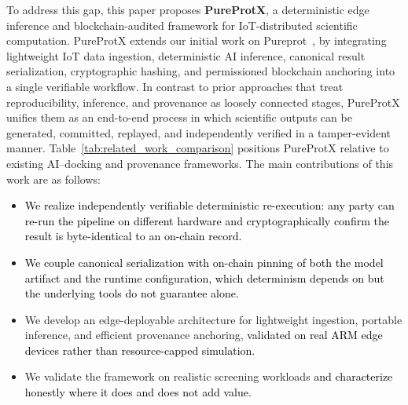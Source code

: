 \documentclass[conference]{IEEEtran}
\begin{document}
To address this gap, this paper proposes \textbf{PureProtX}, a deterministic edge inference and blockchain-audited framework for IoT-distributed scientific computation. PureProtX extends our initial work on Pureprot~\cite{kanu2025pureprot}, by integrating lightweight IoT data ingestion, deterministic AI inference, canonical result serialization, cryptographic hashing, and permissioned blockchain anchoring into a single verifiable workflow. In contrast to prior approaches that treat reproducibility, inference, and provenance as loosely connected stages, PureProtX unifies them as an end-to-end process in which scientific outputs can be generated, committed, replayed, and independently verified in a tamper-evident manner. Table~\ref{tab:related_work_comparison} positions PureProtX relative to existing AI--docking and provenance frameworks.
The main contributions of this work are as follows:  
\begin{itemize}
    \item \textcolor{black}{We realize independently verifiable
    deterministic re-execution: any party can re-run the
    pipeline on different hardware and cryptographically
    confirm the result is byte-identical to an on-chain record.}
    \item \textcolor{black}{We couple canonical serialization with
    on-chain pinning of both the model artifact and the runtime
    configuration, which determinism depends on but the
    underlying tools do not guarantee alone.}
    \item We develop an edge-deployable architecture for
    lightweight ingestion, portable inference, and efficient
    provenance anchoring, \textcolor{black}{validated on real ARM
    edge devices rather than resource-capped simulation.}
    \item We validate the framework on realistic screening
    workloads \textcolor{black}{and characterize honestly where
    it does and does not add value.}
\end{itemize}
\end{document}

